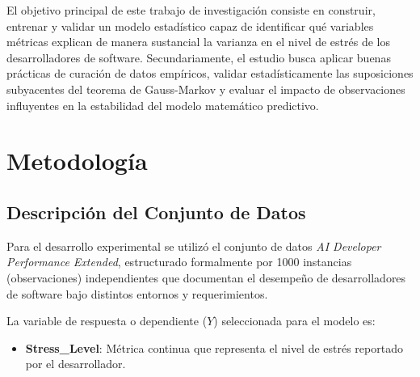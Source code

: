 \documentclass[procedia]{easychair}
\begin{document}
El objetivo principal de este trabajo de investigación consiste en construir, entrenar y validar un modelo estadístico capaz de identificar qué variables métricas explican de manera sustancial la varianza en el nivel de estrés de los desarrolladores de software. Secundariamente, el estudio busca aplicar buenas prácticas de curación de datos empíricos, validar estadísticamente las suposiciones subyacentes del teorema de Gauss-Markov y evaluar el impacto de observaciones influyentes en la estabilidad del modelo matemático predictivo.

\section{Metodología}

\subsection{Descripción del Conjunto de Datos}
Para el desarrollo experimental se utilizó el conjunto de datos \textit{AI Developer Performance Extended}, estructurado formalmente por 1000 instancias (observaciones) independientes que documentan el desempeño de desarrolladores de software bajo distintos entornos y requerimientos. 

La variable de respuesta o dependiente ($Y$) seleccionada para el modelo es:
\begin{itemize}
\item \textbf{Stress\_Level}: Métrica continua que representa el nivel de estrés reportado por el desarrollador.
\end{itemize}
\end{document}
